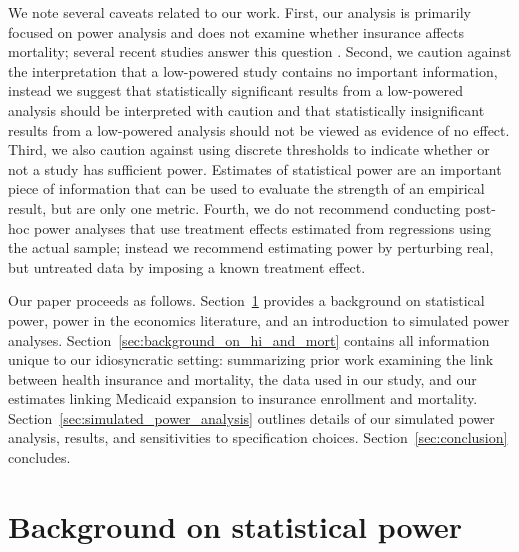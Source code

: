 \documentclass[12pt]{article}%
\begin{document}
We note several caveats related to our work.   
First, our analysis is primarily focused on power analysis and does not examine whether insurance affects mortality; several recent studies answer this question \citep{goldinHealthInsuranceMortality2021,millerMedicaidMortalityNew2019}. 
Second, we caution against the interpretation that a low-powered study contains no important information, instead we suggest that statistically significant results from a low-powered analysis should be interpreted with caution and that statistically insignificant results from a low-powered analysis should not be viewed as evidence of no effect. 
Third, we also caution against using discrete thresholds to indicate whether or not a study has sufficient power. 
Estimates of statistical power are an important piece of information that can be used to evaluate the strength of an empirical result, but are only one metric. 
Fourth, we do not recommend conducting post-hoc power analyses that use treatment effects estimated from regressions using the actual sample; instead we recommend estimating power by perturbing real, but untreated data by imposing a known treatment effect. 
     

Our paper proceeds as follows.
Section~\ref{sec:background_on_power} provides a background on statistical power, power in the economics literature, and an introduction to simulated power analyses. 
Section~\ref{sec:background_on_hi_and_mort} contains all information unique to our idiosyncratic setting: summarizing prior work examining the link between health insurance and mortality, the data used in our study, and our estimates linking Medicaid expansion to  insurance enrollment and mortality.  
Section~\ref{sec:simulated_power_analysis} outlines details of our simulated power analysis, results, and sensitivities to specification choices. 
Section~\ref{sec:conclusion} concludes.



\section{Background on statistical power}\label{sec:background_on_power}
\end{document}
